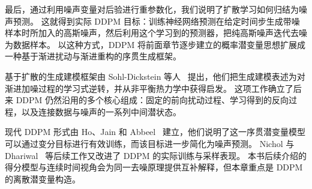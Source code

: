 最后，通过利用噪声变量对后验进行重参数化，我们说明了扩散学习如何归结为噪声预测。
这就得到实际 DDPM 目标：训练神经网络预测在给定时间步生成带噪样本时所加入的高斯噪声，然后利用这个学习到的预测器，把纯高斯噪声迭代去噪为数据样本。
以这种方式，DDPM 将前面章节逐步建立的概率潜变量思想扩展成一种基于渐进扰动与渐进重构的序贯生成框架。

\medskip
\noindent

基于扩散的生成建模框架由 Sohl-Dickstein 等人~\cite{sohl2015deep} 提出，他们把生成建模表述为对渐进加噪过程的学习式逆转，并从非平衡热力学中获得启发。
这项工作确立了后来 DDPM 仍然沿用的多个核心组成：固定的前向扰动过程、学习得到的反向过程，以及连接数据与噪声的一系列中间潜状态。

现代 DDPM 形式由 Ho、Jain 和 Abbeel~\cite{ho2020denoising} 建立，他们说明了这一序贯潜变量模型可以通过变分目标进行有效训练，而该目标进一步简化为噪声预测。
Nichol 与 Dhariwal~\cite{nichol2021improved} 等后续工作又改进了 DDPM 的实际训练与采样表现。
本书后续介绍的得分模型与连续时间视角会为同一去噪原理提供互补解释，但本章重点是 DDPM 的离散潜变量构造。

